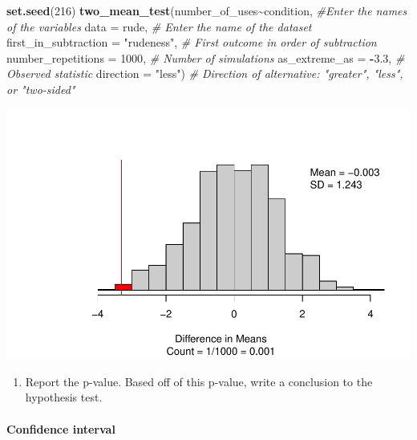 \documentclass[
]{report}
\newenvironment{Shaded}{\begin{snugshade}}{\end{snugshade}}
\newcommand{\AttributeTok}[1]{\textcolor[rgb]{0.13,0.29,0.53}{#1}}
\newcommand{\CommentTok}[1]{\textcolor[rgb]{0.56,0.35,0.01}{\textit{#1}}}
\newcommand{\DecValTok}[1]{\textcolor[rgb]{0.00,0.00,0.81}{#1}}
\newcommand{\FloatTok}[1]{\textcolor[rgb]{0.00,0.00,0.81}{#1}}
\newcommand{\FunctionTok}[1]{\textcolor[rgb]{0.13,0.29,0.53}{\textbf{#1}}}
\newcommand{\NormalTok}[1]{#1}
\newcommand{\SpecialCharTok}[1]{\textcolor[rgb]{0.81,0.36,0.00}{\textbf{#1}}}
\newcommand{\StringTok}[1]{\textcolor[rgb]{0.31,0.60,0.02}{#1}}
\providecommand{\tightlist}{%
  \setlength{\itemsep}{0pt}\setlength{\parskip}{0pt}}
\begin{document}
\begin{Shaded}
\begin{Highlighting}[]
\FunctionTok{set.seed}\NormalTok{(}\DecValTok{216}\NormalTok{)}
\FunctionTok{two\_mean\_test}\NormalTok{(number\_of\_uses}\SpecialCharTok{\textasciitilde{}}\NormalTok{condition, }\CommentTok{\#Enter the names of the variables}
              \AttributeTok{data =}\NormalTok{ rude,  }\CommentTok{\# Enter the name of the dataset}
              \AttributeTok{first\_in\_subtraction =} \StringTok{"rudeness"}\NormalTok{, }\CommentTok{\# First outcome in order of subtraction}
              \AttributeTok{number\_repetitions =} \DecValTok{1000}\NormalTok{,  }\CommentTok{\# Number of simulations}
              \AttributeTok{as\_extreme\_as =} \SpecialCharTok{{-}}\FloatTok{3.3}\NormalTok{,  }\CommentTok{\# Observed statistic}
              \AttributeTok{direction =} \StringTok{"less"}\NormalTok{)  }\CommentTok{\# Direction of alternative: "greater", "less", or "two{-}sided"}
\end{Highlighting}
\end{Shaded}

\begin{center}\includegraphics[width=0.7\linewidth]{12-OCA09-inference-1ofeach-simulation_files/figure-latex/unnamed-chunk-4-1} \end{center}

\begin{enumerate}
\def\labelenumi{\arabic{enumi}.}
\setcounter{enumi}{15}
\tightlist
\item
  Report the p-value. Based off of this p-value, write a conclusion to the hypothesis test.
\end{enumerate}

\vspace{0.8in}

\hypertarget{confidence-interval-8}{%
\paragraph*{Confidence interval}\label{confidence-interval-8}}
\end{document}
